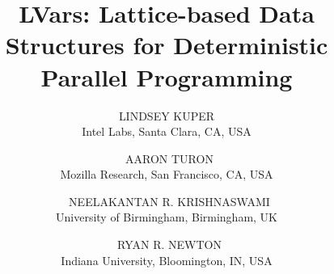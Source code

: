 \documentclass{../latex_common/jfp1}
\title{LVars: Lattice-based Data Structures for Deterministic Parallel Programming}
\author[L. Kuper, A. Turon, N. R. Krishnaswami, and R. R. Newton]
       {LINDSEY KUPER\\
          Intel Labs, Santa Clara, CA, USA\\
        \and\ AARON TURON\\
          Mozilla Research, San Francisco, CA, USA\\
        \and\ NEELAKANTAN R. KRISHNASWAMI\\
          University of Birmingham, Birmingham, UK\\
        \and\ RYAN R. NEWTON\\
        Indiana University, Bloomington, IN, USA}
\begin{document}
\label{firstpage}

\maketitle

\begin{abstract}

\end{abstract}







\newcommand{\myname}[0]{Lindsey Kuper}

\end{document}
